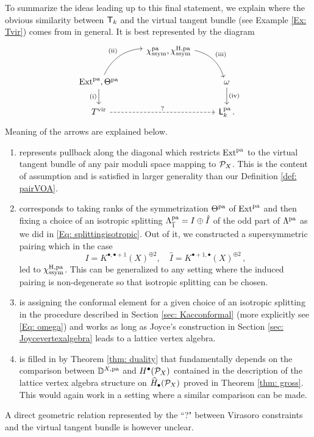 \documentclass[a4paper, 12pt]{amsart}
\begin{document}
\begin{remark}
\label{rem: obstructionvsvirasoro}
 To summarize the ideas leading up to this final statement, we explain where the obvious similarity between ${\mathsf{T}}_k$ and the virtual tangent bundle (see Example \ref{Ex: Tvir}) comes from in general. It is best represented by the diagram
 $$
 \begin{tikzcd}
&\chi^{\pa}_{\ssym},\chi^{\HH,\pa}_{\ssym}\arrow[dr,"(\textnormal{iii})", bend left]&\\
\arrow[d,"(\textnormal{i})"']\Ext^{\pa},\Theta^{\pa} \arrow[ur,"(\textnormal{ii})", bend left]&&\omega\arrow[d, "(\textnormal{iv})"]\\
T^{\vir}\arrow[rr,dashed,"?"]&&\bL_k^{\pa}\,.
 \end{tikzcd}
 $$
Meaning of the arrows are explained below. 
 \begin{enumerate}[label = (\roman*)]
\item   represents pullback along the diagonal which restricts $\textup{Ext}^{\mathop{\rm pa}\nolimits}$ to the virtual tangent bundle of any pair moduli space mapping to ${\mathcal P}_X$. This is the content of assumption \cite[Assumption 4.4]{Jo21} and is satisfied in larger generality than our Definition \ref{def: pairVOA}.
\item  corresponds to taking ranks of the symmetrization $\Theta^{\mathop{\rm pa}\nolimits}$ of $\textup{Ext}^{\mathop{\rm pa}\nolimits}$ and then fixing a choice of an isotropic splitting  $\Lambda_{\overline{1}}^{\mathop{\rm pa}\nolimits} = I\oplus \hat{I}$ of the odd part of $\Lambda^{\mathop{\rm pa}\nolimits}$ as we did in \eqref{Eq: splittingisotropic}. Out of it, we constructed a supersymmetric pairing  which in the case 
$$
I= K^{\bullet,\bullet+1}(X)^{\oplus 2},\quad \hat{I}= K^{\bullet+1,\bullet}(X)^{\oplus 2}\,,
$$
led to $\chi^{\mathrm{H},\mathop{\rm pa}\nolimits}_{\text{ssym}}$. This can be generalized to any setting where the induced pairing is non-degenerate so that isotropic splitting can be chosen.
\item is assigning the conformal element for a given choice of an isotropic splitting in the procedure described in Section \ref{sec: Kacconformal} (more explicitly see \eqref{Eq: omega}) and works as long as Joyce's construction in Section \ref{sec: Joycevertexalgebra} leads to a lattice vertex algebra.
\item is filled in by Theorem \ref{thm: duality} that fundamentally depends on the comparison between ${\mathbb{D}}^{X,\mathop{\rm pa}\nolimits}$ and $H^\bullet({\mathcal P}_{X})$ contained in the description of the lattice vertex algebra structure on $\widehat{H}_\bullet({\mathcal P}_X)$ proved in Theorem \ref{thm: gross}. This would again work in a setting where a similar comparison can be made.
 \end{enumerate}
 A direct geometric relation represented by the ``?" between Virasoro constraints and the virtual tangent bundle is however unclear.
\end{remark}
\end{document}
